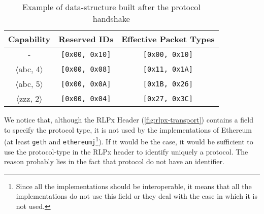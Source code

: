 \begin{table}
  \begin{center}
    \begin{tabular}{c | c | c }
      Capability & Reserved IDs & Effective Packet Types\\
      \hline
      - & \texttt{[0x00, 0x10]} & \texttt{[0x00, 0x10]} \\
      $\langle$abc, 4$\rangle$ & \texttt{[0x00, 0x08]} & \texttt{[0x11, 0x1A]} \\
      $\langle$abc, 5$\rangle$ & \texttt{[0x00, 0x0A]} & \texttt{[0x1B, 0x26]} \\
      $\langle$zzz, 2$\rangle$ & \texttt{[0x00, 0x04]} & \texttt{[0x27, 0x3C]} \\
    \end{tabular}
    \caption{Example of data-structure built after the protocol handshake}
    \label{table:capabilities}
  \end{center}
\end{table}

We notice that, although the RLPx Header (\autoref{fig:rlpx-transport}) contains
a field to specify the protocol type, it is not used by the implementations of
Ethereum (at least \texttt{geth} and \texttt{ethereumj}\footnote{Since all the
implementations should be interoperable, it means that all the implementations
do not use this field or they deal with the case in which it is not used.}). If
it would be the case, it would be sufficient to use the protocol-type in the
RLPx header to identify uniquely a protocol. The reason probably lies in the
fact that \devpp{} protocol do not have an identifier.
